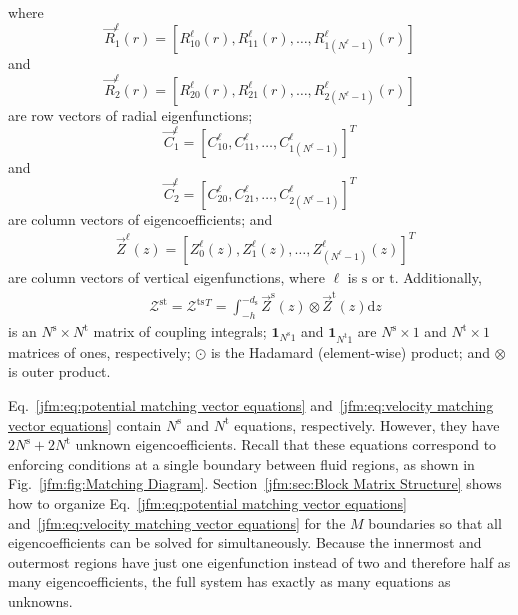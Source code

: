 where 
\begin{equation}
    \vec{R}_1^\ell(r)=[R_{10}^\ell(r), R_{11}^\ell(r),\dots, R_{1(N^\ell-1)}^\ell(r) ]
\end{equation}
and
\begin{equation}
     \vec{R}_2^\ell(r)=[R_{20}^\ell(r), R_{21}^\ell(r),\dots, R_{2(N^\ell-1)}^\ell(r) ] 
\end{equation}
 are row vectors of radial eigenfunctions;
\begin{equation}
    \vec{C}_1^\ell=[C_{10}^\ell, C_{11}^\ell,\dots, C_{1(N^\ell-1)}^\ell]^T
\end{equation}
and
\begin{equation}
    \vec{C}_2^\ell=[C_{20}^\ell, C_{21}^\ell,\dots, C_{2(N^\ell-1)}^\ell]^T
\end{equation}
 are column vectors of eigencoefficients; and
\begin{equation}
\begin{aligned}
    &\vec{Z}^\ell(z)=[Z_0^\ell(z),Z_1^\ell(z),\dots, Z_{(N^\ell-1)}^\ell(z)]^T 
\end{aligned}
\end{equation}
are column vectors of vertical eigenfunctions, where $\ell$ is $\mathrm{s}$ or $\mathrm{t}$. Additionally,  
\begin{equation}
    \begin{aligned}    &\boldsymbol{\mathcal{Z}}^\mathrm{st}=\boldsymbol{\mathcal{Z}}^\mathrm{ts}{}^T=\int_{-h}^{-d_\mathrm{s}} \vec{Z}^\mathrm{s}{}(z) \otimes \vec{Z}^\mathrm{t}(z) \mathrm{d}z
\end{aligned}
\end{equation}
is an $N^\mathrm{s} \times N^\mathrm{t}$ matrix of coupling integrals; $\mathbf{1}_{N^\mathrm{s}1}$ and $\mathbf{1}_{N^\mathrm{t}1}$ are $N^\mathrm{s} \times 1$ and $N^\mathrm{t} \times 1$ matrices of ones, respectively; $\odot$ is the Hadamard (element-wise) product; and $\otimes$ is outer product. 



  Eq.~\ref{jfm:eq:potential matching vector equations} and~\ref{jfm:eq:velocity matching vector equations} contain $N^\mathrm{s}$ and $N^\mathrm{t}$ equations, respectively. However, they have $2N^\mathrm{s} + 2N^\mathrm{t}$ unknown eigencoefficients. Recall that these equations correspond to enforcing conditions at a single boundary between fluid regions, as shown in Fig.~\ref{jfm:fig:Matching Diagram}. Section~\ref{jfm:sec:Block Matrix Structure} shows how to organize Eq.~\ref{jfm:eq:potential matching vector equations} and~\ref{jfm:eq:velocity matching vector equations} for the $M$ boundaries so that all eigencoefficients can be solved for simultaneously.
  Because the innermost and outermost regions have just one eigenfunction instead of two and therefore half as many eigencoefficients, the full system has exactly as many equations as unknowns.


